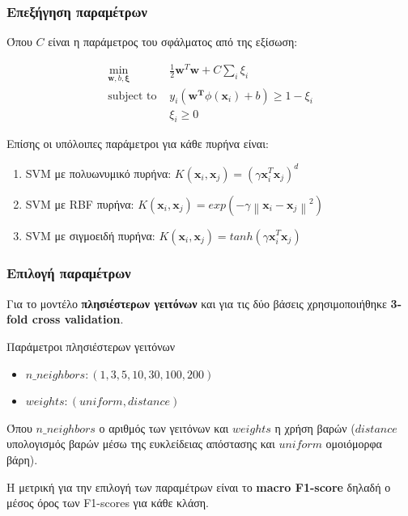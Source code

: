 \documentclass{beamer}
\newcommand\norm[1]{\left\lVert#1\right\rVert}
\begin{document}
\begin{frame}
\frametitle{Επεξήγηση παραμέτρων}

Όπου $C$ είναι η παράμετρος του σφάλματος από της εξίσωση:

\begin{equation*}
\begin{split}
\min_{\bm{w},b,\bm{\xi}} & \frac{1}{2} \bm{w}^T\bm{w} + C \sum_{i} \xi_{i} \\
\text{subject to } & y_i (\bm{w^T} \phi (\bm{x}_i) + b) \ge 1 - \xi_i \\
 & \xi_i \ge 0
\end{split}
\end{equation*}

Επίσης οι υπόλοιπες παράμετροι για κάθε πυρήνα είναι:

\begin{enumerate}
    \item SVM με πολυωνυμικό πυρήνα: $K(\bm{x}_i,\bm{x}_j) = (\gamma \bm{x}_i^T
        \bm{x}_j)^d$
    \item SVM με RBF πυρήνα: $K(\bm{x}_i,\bm{x}_j) = exp(-\gamma
        \norm{\bm{x}_i - \bm{x}_j}^2)$
    \item SVM με σιγμοειδή πυρήνα: $K(\bm{x}_i,\bm{x}_j) = tanh(\gamma
        \bm{x}_i^T \bm{x}_j)$
\end{enumerate}

\end{frame}

\begin{frame}
\frametitle{Επιλογή παραμέτρων}

Για το μοντέλο \textbf{πλησιέστερων γειτόνων} και για τις δύο βάσεις
χρησιμοποιήθηκε \textbf{3-fold cross validation}.

\begin{block}{Παράμετροι πλησιέστερων γειτόνων}
\begin{itemize}
    \item $n\_neighbors: (1, 3, 5, 10, 30, 100, 200)$
    \item $weights: (uniform, distance)$
\end{itemize}
Όπου $n\_neighbors$ ο αριθμός των γειτόνων και $weights$ η χρήση βαρών
($distance$ υπολογισμός βαρών μέσω της ευκλείδειας απόστασης και $uniform$
ομοιόμορφα βάρη).
\end{block} \pause

Η μετρική για την επιλογή των παραμέτρων είναι το \textbf{macro F1-score} δηλαδή
ο μέσος όρος των F1-scores για κάθε κλάση.

\end{frame}
\end{document}
